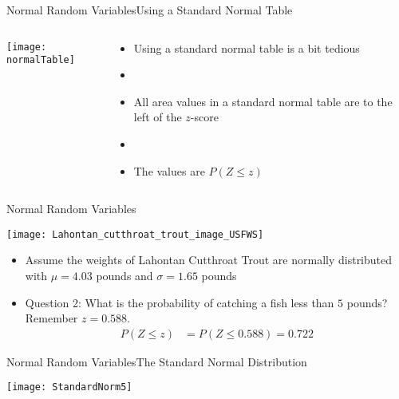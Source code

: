 \documentclass[xcolor=dvipsnames]{beamer}
\begin{document}
\begin{frame}{Normal Random Variables}{Using a Standard Normal Table}
	\begin{columns}
		\begin{column}{.6 \textwidth}
				\vspace{-15pt}
				\texttt{[image: normalTable]}
		\end{column}
		\begin{column}{.4 \textwidth}
			\begin{itemize}
				\item Using a standard normal table is a bit tedious
				\item[]
				\item All area values in a standard normal table are to the left of the $z$-score
				\item[]
				\item The values are $P(Z\leq z)$
			\end{itemize}
		\end{column}
	\end{columns}
\end{frame}


\begin{frame}{Normal Random Variables}
	\begin{center}
		\texttt{[image: Lahontan\_cutthroat\_trout\_image\_USFWS]}
	\end{center}
	\begin{itemize}
		\item Assume the weights of Lahontan Cutthroat Trout are normally distributed with $\mu = 4.03$ pounds and $\sigma = 1.65$ pounds
		\item Question 2: What is the probability of catching a fish less than $5$ pounds? Remember $z = 0.588$.
		\begin{align*}
		P(Z\leq z) &= P(Z \leq 0.588) = 0.722
		\end{align*}
	\end{itemize}
\end{frame}

\begin{frame}{Normal Random Variables}{The Standard Normal Distribution}
	\begin{center}
		\texttt{[image: StandardNorm5]}
	\end{center}
\end{frame}
\end{document}
